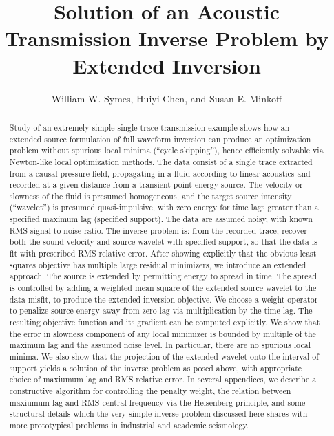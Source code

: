 \title{Solution of an Acoustic Transmission Inverse Problem by Extended Inversion}
\author{William W. Symes\footnotemark[1], Huiyi Chen\footnotemark[2],
  and Susan E. Minkoff\footnotemark[2]}
\address{\footnotemark[1]PO Box 43, Orcas, WA 98280 USA\\
  \footnotemark[2]Department of Mathematical Sciences, FO 35, 
  University of Texas at Dallas, Richardson, TX 75080 USA}



\maketitle
\begin{abstract}
  Study of an extremely simple single-trace transmission example shows
  how an extended source formulation of full waveform inversion can
  produce an optimization problem without spurious local minima
  (``cycle skipping''), hence efficiently solvable via Newton-like
  local optimization methods. The data consist of a single trace
  extracted from a causal pressure field, propagating in a fluid
  according to linear acoustics and recorded at a given distance from
  a transient point energy source. The velocity or slowness of the
  fluid is presumed homogeneous, and the target source intensity
  (``wavelet'') is presumed quasi-impulsive, with zero energy for time
  lags greater than a specified maximum lag (specified support). The
  data are assumed noisy, with known RMS signal-to-noise ratio. The
  inverse problem is: from the recorded trace, recover both the sound
  velocity and source wavelet with specified support, so that the data
  is fit with prescribed RMS relative error. After showing explicitly that
  the obvious least squares objective has multiple large residual
  minimizers, we introduce an extended approach. The source is extended by
  permitting energy to spread in time. The spread is controlled by
  adding a weighted mean square of the extended source wavelet to the
  data misfit, to produce the extended inversion objective. We choose
  a weight operator to penalize source energy away from zero lag via
  multiplication by the time lag. The resulting objective function and
  its gradient can be computed explicitly. We show that the error in 
  slowness component of any local minimizer is bounded by multiple of
  the maximum lag and the assumed noise level. In particular, there
  are no spurious local minima. We also show that the projection of
  the extended wavelet onto the interval of support yields a solution
  of the inverse problem as posed above, with appropriate choice of
  maxiumum lag and RMS relative error. In several appendices, we
  describe a constructive algorithm for controlling the penalty
  weight, the relation between maxiumum lag and RMS central frequency
  via the Heisenberg principle, and some structural details which the
  very simple inverse problem discussed here shares with more
  prototypical problems in industrial and academic seismology.
  

\end{abstract}
